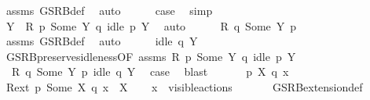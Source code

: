 \begin{isabellebody}
\ assms\ GSRB{\isacharunderscore}{\kern0pt}def\ \isamarkupfalse%
\ auto\isanewline
\ \ \ \ \isamarkupfalse%
\ {\isacharquery}{\kern0pt}case\ \isamarkupfalse%
\ simp\isanewline
\ \ \isamarkupfalse%
\isanewline
\ \ \ \ \isamarkupfalse%
\ {}\isanewline
\ \ \ \ \isamarkupfalse%
\ \isamarkupfalse%
\ Y\ \ {\isacartoucheopen}R\ p\ {\isacharparenleft}{\kern0pt}Some\ Y{\isacharparenright}{\kern0pt}\ q{\isacartoucheclose}\ {\isacartoucheopen}idle\ p\ Y{\isacartoucheclose}\ \isamarkupfalse%
\ auto\isanewline
\ \ \ \ \isamarkupfalse%
\ {\isacartoucheopen}R\ q\ {\isacharparenleft}{\kern0pt}Some\ Y{\isacharparenright}{\kern0pt}\ p{\isacartoucheclose}\isanewline
\ \ \ \ \ \ \isamarkupfalse%
\ assms\ GSRB{\isacharunderscore}{\kern0pt}def\ \isamarkupfalse%
\ auto\isanewline
\ \ \ \ \isamarkupfalse%
\ {\isacartoucheopen}idle\ q\ Y{\isacartoucheclose}\isanewline
\ \ \ \ \ \ \isamarkupfalse%
\ GSRB{\isacharunderscore}{\kern0pt}preserves{\isacharunderscore}{\kern0pt}idleness{\isacharbrackleft}{\kern0pt}OF\ assms{\isacharbrackright}{\kern0pt}\ {\isacartoucheopen}R\ p\ {\isacharparenleft}{\kern0pt}Some\ Y{\isacharparenright}{\kern0pt}\ q{\isacartoucheclose}\ {\isacartoucheopen}idle\ p\ Y{\isacartoucheclose}\ \isacommand{{\isachardot}{\kern0pt}}\isamarkupfalse%
\isanewline
\ \ \ \ \isamarkupfalse%
\ {}\ {\isacartoucheopen}R\ q\ {\isacharparenleft}{\kern0pt}Some\ Y{\isacharparenright}{\kern0pt}\ p{\isacartoucheclose}\ {\isacartoucheopen}idle\ q\ Y{\isacartoucheclose}\ \isamarkupfalse%
\ {\isacharquery}{\kern0pt}case\ \isamarkupfalse%
\ blast\isanewline
\ \ \isamarkupfalse%
\isanewline
{}\isamarkupfalse%
\isanewline
\ \ \isamarkupfalse%
\ p\ X\ q\ x\isanewline
\ \ \isamarkupfalse%
\ {\isacartoucheopen}{\isacharquery}{\kern0pt}R{\isacharunderscore}{\kern0pt}ext\ p\ {\isacharparenleft}{\kern0pt}Some\ X{\isacharparenright}{\kern0pt}\ q{\isacartoucheclose}\ {\isacartoucheopen}x\ {\isasymin}\ X{\isacartoucheclose}\isanewline
\ \ \isamarkupfalse%
\ {\isacartoucheopen}x\ {\isasymin}\ visible{\isacharunderscore}{\kern0pt}actions{\isacartoucheclose}\ \isanewline
\ \ \ \ \isamarkupfalse%
\ GSRB{\isacharunderscore}{\kern0pt}extension{\isacharunderscore}{\kern0pt}def\isanewline
\ \ \isamarkupfalse%

\end{isabellebody}
